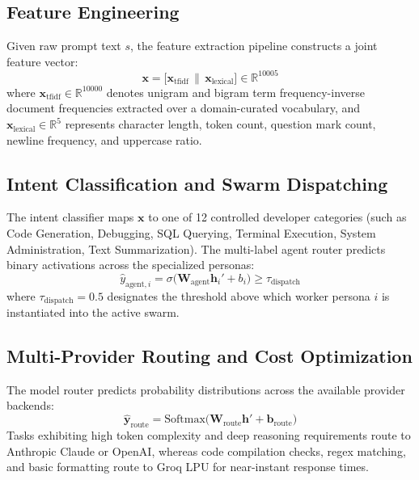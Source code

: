 \documentclass[12pt,a4paper]{report}
\begin{document}
\subsection{Feature Engineering}
Given raw prompt text $s$, the feature extraction pipeline constructs a joint feature vector:
\begin{equation}
    \mathbf{x} = \big[ \mathbf{x}_{\text{tfidf}} \,\parallel\, \mathbf{x}_{\text{lexical}} \big] \in \mathbb{R}^{10005}
\end{equation}
where $\mathbf{x}_{\text{tfidf}} \in \mathbb{R}^{10000}$ denotes unigram and bigram term frequency-inverse document frequencies extracted over a domain-curated vocabulary, and $\mathbf{x}_{\text{lexical}} \in \mathbb{R}^5$ represents character length, token count, question mark count, newline frequency, and uppercase ratio.

\subsection{Intent Classification and Swarm Dispatching}
The intent classifier maps $\mathbf{x}$ to one of 12 controlled developer categories (such as Code Generation, Debugging, SQL Querying, Terminal Execution, System Administration, Text Summarization). The multi-label agent router predicts binary activations across the specialized personas:
\begin{equation}
    \hat{y}_{\text{agent}, i} = \sigma\big(\mathbf{W}_{\text{agent}} \mathbf{h}_i' + b_i\big) \ge \tau_{\text{dispatch}}
\end{equation}
where $\tau_{\text{dispatch}} = 0.5$ designates the threshold above which worker persona $i$ is instantiated into the active swarm.

\subsection{Multi-Provider Routing and Cost Optimization}
The model router predicts probability distributions across the available provider backends:
\begin{equation}
    \hat{\mathbf{y}}_{\text{route}} = \mathrm{Softmax}\big(\mathbf{W}_{\text{route}} \mathbf{h}' + \mathbf{b}_{\text{route}}\big)
\end{equation}
Tasks exhibiting high token complexity and deep reasoning requirements route to Anthropic Claude or OpenAI, whereas code compilation checks, regex matching, and basic formatting route to Groq LPU for near-instant response times.
\end{document}
